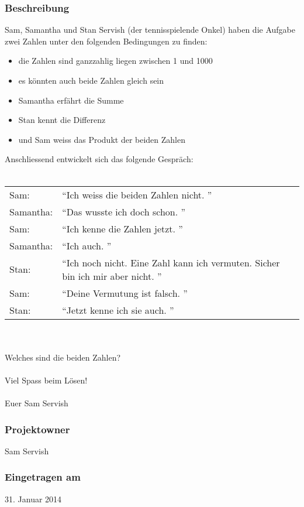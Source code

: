 \documentclass[a4paper, 10pt, fleqn]{article}
\begin{document}
\subsubsection*{Beschreibung}
Sam, Samantha und Stan Servish (der tennisspielende Onkel) haben die Aufgabe 
zwei Zahlen unter den folgenden Bedingungen zu finden:
\begin{itemize}
\item die Zahlen sind ganzzahlig liegen zwischen 1 und 1000
\item es könnten auch beide Zahlen gleich sein
\item Samantha erfährt die Summe
\item Stan kennt die Differenz
\item und Sam weiss das Produkt der beiden Zahlen
\end{itemize}
Anschliessend entwickelt sich das folgende Gespräch:
\\\\
\begin{tabular}{ll}
Sam:      & "`Ich weiss die beiden Zahlen nicht. "' \\
Samantha: & "`Das wusste ich doch schon. "' \\
Sam:      & "`Ich kenne die Zahlen jetzt. "' \\
Samantha: & "`Ich auch. "' \\
Stan:     & "`Ich noch nicht. Eine Zahl kann ich vermuten. Sicher bin ich mir 
              aber nicht. "' \\
Sam:      & "`Deine Vermutung ist falsch. "' \\
Stan:     & "`Jetzt kenne ich sie auch. "' \\
\end{tabular}
\\\\
Welches sind die beiden Zahlen?
\\\\
Viel Spass beim Lösen!
\\\\
Euer Sam Servish

\subsubsection*{Projektowner}
Sam Servish 

\subsubsection*{Eingetragen am}
31. Januar 2014 \\
\end{document}
